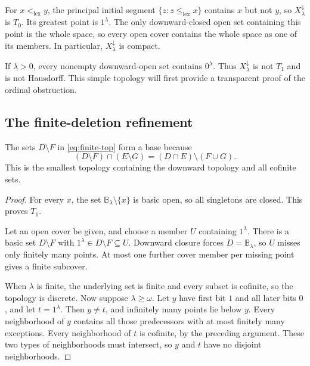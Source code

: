 \documentclass[11pt,a4paper]{article}
\newtheorem{proposition}[theorem]{Proposition}
\theoremstyle{definition}
\theoremstyle{remark}
\newcommand{\lex}{\mathrm{lex}}
\newcommand{\fin}{\mathrm{fin}}
\newcommand{\dd}{\downarrow}
\newcommand{\B}{\mathbb B}
\begin{document}
For $x<_{\lex}y$, the principal initial segment
$\{z:z\leq_{\lex}x\}$ contains $x$ but not $y$, so $X_\lambda^\dd$ is $T_0$.
Its greatest point is $1^\lambda$. The only downward-closed open set containing
this point is the whole space, so every open cover contains the whole space as
one of its members. In particular, $X_\lambda^\dd$ is compact.

If $\lambda>0$, every nonempty downward-open set contains $0^\lambda$. Thus
$X_\lambda^\dd$ is not $T_1$ and is not Hausdorff. This simple topology will first
provide a transparent proof of the ordinal obstruction.

\subsection{The finite-deletion refinement}
The sets $D\setminus F$ in \eqref{eq:finite-top} form a base because
\[
 (D\setminus F)\cap(E\setminus G)
             =(D\cap E)\setminus(F\cup G).
\]
This is the smallest topology containing the downward topology and all cofinite
sets.

\begin{proof}
For every $x$, the set $\B_\lambda\setminus\{x\}$ is basic open, so all singletons
are closed. This proves $T_1$.

Let an open cover be given, and choose a member $U$ containing $1^\lambda$.
There is a basic set $D\setminus F$ with
$1^\lambda\in D\setminus F\subseteq U$. Downward closure forces
$D=\B_\lambda$, so $U$ misses only finitely many points. At most one further
cover member per missing point gives a finite subcover.

When $\lambda$ is finite, the underlying set is finite and every subset is
cofinite, so the topology is discrete. Now suppose $\lambda\geq\omega$. Let
$y$ have first bit $1$ and all later bits $0$, and let $t=1^\lambda$. Then
$y\ne t$, and infinitely many points lie below $y$. Every neighborhood of $y$
contains all those predecessors with at most finitely many exceptions. Every
neighborhood of $t$ is cofinite, by the preceding argument. These two types of
neighborhoods must intersect, so $y$ and $t$ have no disjoint neighborhoods.
\end{proof}
\end{document}
